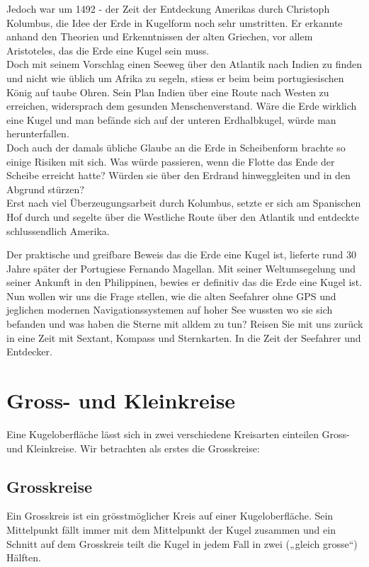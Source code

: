 \begin{refsection}
Jedoch war um 1492 - der Zeit der Entdeckung Amerikas durch Christoph Kolumbus, die Idee der Erde in Kugelform noch sehr umstritten. Er erkannte anhand den Theorien und Erkenntnissen der alten Griechen, vor allem Aristoteles, das die Erde eine Kugel sein muss. \\
Doch mit seinem Vorschlag einen Seeweg über den Atlantik nach Indien zu finden und nicht wie üblich um Afrika zu segeln, stiess er beim beim portugiesischen König auf taube Ohren. Sein Plan Indien über eine Route nach Westen zu erreichen, widersprach dem gesunden Menschenverstand. Wäre die Erde wirklich eine Kugel und man befände sich auf der unteren Erdhalbkugel, würde man herunterfallen.\\
Doch auch der damals übliche Glaube an die Erde in Scheibenform brachte so einige Risiken mit sich. Was würde passieren, wenn die Flotte das Ende der Scheibe erreicht hatte? Würden sie über den Erdrand hinweggleiten und in den Abgrund stürzen?\\
Erst nach viel Überzeugungsarbeit durch Kolumbus, setzte er sich am Spanischen Hof durch und segelte über die Westliche Route über den Atlantik und entdeckte schlussendlich Amerika.

Der praktische und greifbare Beweis das die Erde eine Kugel ist, lieferte rund 30 Jahre später der Portugiese Fernando Magellan. Mit seiner Weltumsegelung und seiner Ankunft in den Philippinen, bewies er definitiv das die Erde eine Kugel ist.\\

Nun wollen wir uns die Frage stellen, wie die alten Seefahrer ohne GPS und jeglichen modernen Navigationssystemen auf hoher See wussten wo sie sich befanden und was haben die Sterne mit alldem zu tun? Reisen Sie mit uns zurück in eine Zeit mit Sextant, Kompass und Sternkarten. In die Zeit der Seefahrer und Entdecker.


\section{Gross- und Kleinkreise}

Eine Kugeloberfläche lässt sich in zwei verschiedene Kreisarten einteilen  Gross- und Kleinkreise. 
Wir betrachten als erstes die Grosskreise:

\subsection{Grosskreise}

\begin{definition}
Ein Grosskreis ist ein grösstmöglicher Kreis auf einer Kugeloberfläche. Sein Mittelpunkt fällt immer mit dem Mittelpunkt der Kugel zusammen und ein Schnitt auf dem Grosskreis teilt die Kugel in jedem Fall in zwei („gleich grosse“) Hälften.
\end{definition}


\end{refsection}
